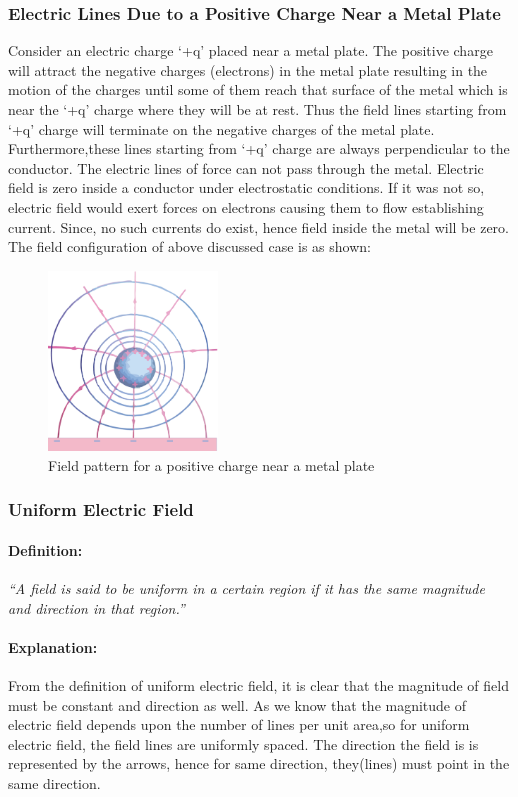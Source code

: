 \subsubsection{Electric Lines Due to a Positive Charge Near a Metal Plate}
Consider an electric charge ‘+q’ placed near a metal plate.
The positive charge will attract the negative charges (electrons) in
the metal plate resulting in the motion of the charges until some
of them reach that surface of the metal which is near the ‘+q’
charge where they will be at rest. Thus the field lines starting from
‘+q’ charge will terminate on the negative charges of the metal plate.
Furthermore,these lines starting from ‘+q’ charge are always perpendicular
to the conductor. The electric lines of force can not pass through the metal.
Electric field is zero inside a conductor under electrostatic conditions.
If it was not so, electric field would exert forces on electrons
causing them to flow establishing current. Since, no such currents do exist,
hence field inside the metal will be zero.
The field configuration of above discussed case is as shown:

\begin{figure}[H]
  \centering
  \includegraphics[width=0.4\textwidth]{Images/11.7.png}
  \caption{Field pattern for a positive charge near a metal plate}
  \label{fig:11.7}
\end{figure}

\subsubsection{Uniform Electric Field}
\paragraph{Definition:}
\textit{“A field is said to be uniform in a certain region 
if it has the same magnitude and direction in that region.”}
\paragraph{Explanation:}
From the definition of uniform electric field, it is clear
that the magnitude of field must be constant and direction as well.
As we know that the magnitude of electric field depends upon the number
of lines per unit area,so for uniform electric field, the field lines
are uniformly spaced. The direction the field is is represented by the
arrows, hence for same direction,
they(lines) must point in the same direction.
